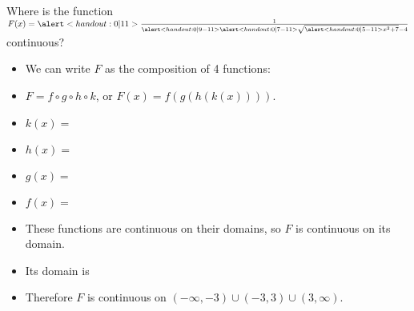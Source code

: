\begin{frame}
\begin{example}%
Where is the function $F(x) = \alert<handout:0 |11>{\frac{1}{\alert<handout:0 |9-11>{\alert<handout:0 |7-11>{\sqrt{\alert<handout:0 |5-11>{x^2+7}}} - 4}}}$ continuous?
\begin{itemize}
\item<2->  We can write $F$ as the composition of 4 functions:
\item<2->  $F = f\circ g\circ h\circ k$, or $F(x) = f(g(h(k(x))))$.
\item<3-| alert@4-5>  $k(x) = $ 
\item<3-| alert@6-7>  $h(x) = $ 
\item<3-| alert@8-9>  $g(x) = $ 
\item<3-| alert@10-11>  $f(x) = $ 
\item<12->  These functions are continuous on their domains, so $F$ is continuous on its domain.
\item<13->  Its domain is 
\item<15->  Therefore $F$ is continuous on $(-\infty , -3 ) \cup (-3, 3) \cup (3, \infty )$.
\end{itemize}
\end{example}
\end{frame}
